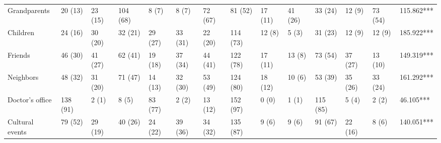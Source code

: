 \documentclass[output=paper,hidelinks]{langscibook}
\begin{document}
\begin{sidewaystable}
{\begin{tabular}{@{}llllllllllllll@{}}
Grandparents                                                               & 20 (13)  & 23 (15)                                                 & 104 (68) & 8 (7)      & 8 (7)                                                      & 72 (67)   & 81 (52)   & 17 (11)                                                  & 41 (26) & 33 (24)   & 12 (9)                                                   & 73 (54)  & 115.862*** \\
Children                                                                   & 24 (16)  & 30 (20)                                                 & 32 (21)  & 29 (27)    & 33 (31)                                                    & 22 (20)   & 114 (73)  & 12 (8)                                                   & 5 (3)   & 31 (23)   & 12 (9)                                                   & 12 (9)   & 185.922*** \\
Friends                                                                    & 46 (30)  & 41 (27)                                                 & 62 (41)  & 19 (18)    & 37 (34)                                                    & 44 (41)   & 122 (78)  & 17 (11)                                                  & 13 (8)  & 73 (54)   & 37 (27)                                                  & 13 (10)  & 149.319*** \\
Neighbors                                                                  & 48 (32)  & 31 (20)                                                 & 71 (47)  & 14 (13)    & 32 (30)                                                    & 53 (49)   & 124 (80)  & 18 (12)                                                  & 10 (6)  & 53 (39)   & 35 (26)                                                  & 33 (24)  & 161.292*** \\
Doctor’s office                                                            & 138 (91) & 2 (1)                                                   & 8 (5)    & 83 (77)    & 2 (2)                                                      & 13 (12)   & 152 (97)  & 0 (0)                                                    & 1 (1)   & 115 (85)  & 5 (4)                                                    & 2 (2)    & 46.105***  \\
Cultural events                                                            & 79 (52)  & 29 (19)                                                 & 40 (26)  & 24 (22)    & 39 (36)                                                    & 34 (32)   & 135 (87)  & 9 (6)                                                    & 9 (6)   & 91 (67)   & 22 (16)                                                  & 8 (6)    & 140.051*** \\

\end{tabular}}
\end{sidewaystable}
\end{document}
